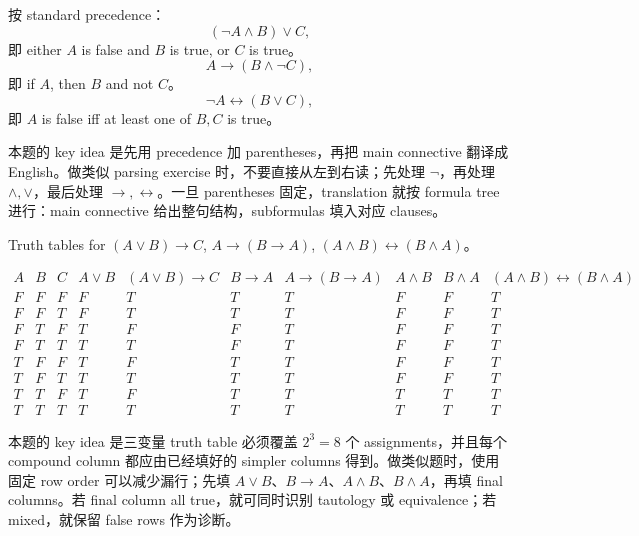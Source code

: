 \begin{solution}
按 standard precedence：
\[
(\lnot A\land B)\lor C,
\]
即 either \(A\) is false and \(B\) is true, or \(C\) is true。
\[
A\to(B\land\lnot C),
\]
即 if \(A\), then \(B\) and not \(C\)。
\[
\lnot A\leftrightarrow(B\lor C),
\]
即 \(A\) is false iff at least one of \(B,C\) is true。
\end{solution}

\begin{explanation}
本题的 key idea 是先用 precedence 加 parentheses，再把 main connective 翻译成 English。做类似 parsing exercise 时，不要直接从左到右读；先处理 \(\lnot\)，再处理 \(\land,\lor\)，最后处理 \(\to,\leftrightarrow\)。一旦 parentheses 固定，translation 就按 formula tree 进行：main connective 给出整句结构，subformulas 填入对应 clauses。
\end{explanation}

\begin{exerciseblock}
Truth tables for \((A\lor B)\to C\), \(A\to(B\to A)\), \((A\land B)\leftrightarrow(B\land A)\)。
\end{exerciseblock}

\begin{solution}
\[
\begin{array}{ccc|ccccccc}
A&B&C&A\lor B&(A\lor B)\to C&B\to A&A\to(B\to A)&A\land B&B\land A&(A\land B)\leftrightarrow(B\land A)\\
\hline
F&F&F&F&T&T&T&F&F&T\\
F&F&T&F&T&T&T&F&F&T\\
F&T&F&T&F&F&T&F&F&T\\
F&T&T&T&T&F&T&F&F&T\\
T&F&F&T&F&T&T&F&F&T\\
T&F&T&T&T&T&T&F&F&T\\
T&T&F&T&F&T&T&T&T&T\\
T&T&T&T&T&T&T&T&T&T
\end{array}
\]
\end{solution}

\begin{explanation}
本题的 key idea 是三变量 truth table 必须覆盖 \(2^3=8\) 个 assignments，并且每个 compound column 都应由已经填好的 simpler columns 得到。做类似题时，使用固定 row order 可以减少漏行；先填 \(A\lor B\)、\(B\to A\)、\(A\land B\)、\(B\land A\)，再填 final columns。若 final column all true，就可同时识别 tautology 或 equivalence；若 mixed，就保留 false rows 作为诊断。
\end{explanation}

